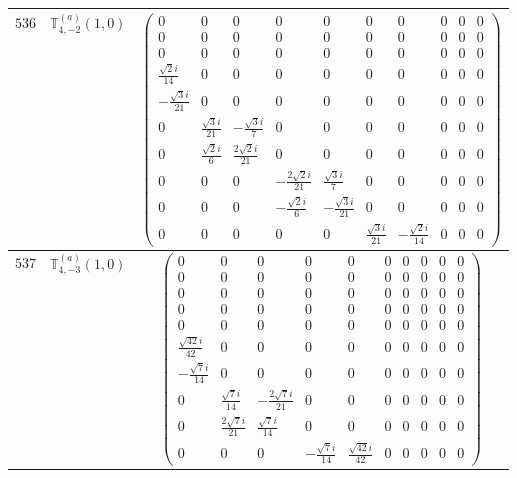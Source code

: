\documentclass[fleqn,8pt,landscape]{jsarticle}
\begin{document}
\begin{center}
\begin{longtable}{ccc}
$ 536 $ & $ \mathbb{T}_{4,-2}^{(a)}(1,0) $ & $ \begin{pmatrix} 0 & 0 & 0 & 0 & 0 & 0 & 0 & 0 & 0 & 0 \\ 0 & 0 & 0 & 0 & 0 & 0 & 0 & 0 & 0 & 0 \\ 0 & 0 & 0 & 0 & 0 & 0 & 0 & 0 & 0 & 0 \\ \frac{\sqrt{2} i}{14} & 0 & 0 & 0 & 0 & 0 & 0 & 0 & 0 & 0 \\ - \frac{\sqrt{3} i}{21} & 0 & 0 & 0 & 0 & 0 & 0 & 0 & 0 & 0 \\ 0 & \frac{\sqrt{3} i}{21} & - \frac{\sqrt{3} i}{7} & 0 & 0 & 0 & 0 & 0 & 0 & 0 \\ 0 & \frac{\sqrt{2} i}{6} & \frac{2 \sqrt{2} i}{21} & 0 & 0 & 0 & 0 & 0 & 0 & 0 \\ 0 & 0 & 0 & - \frac{2 \sqrt{2} i}{21} & \frac{\sqrt{3} i}{7} & 0 & 0 & 0 & 0 & 0 \\ 0 & 0 & 0 & - \frac{\sqrt{2} i}{6} & - \frac{\sqrt{3} i}{21} & 0 & 0 & 0 & 0 & 0 \\ 0 & 0 & 0 & 0 & 0 & \frac{\sqrt{3} i}{21} & - \frac{\sqrt{2} i}{14} & 0 & 0 & 0 \end{pmatrix} $ \\ \hline
$ 537 $ & $ \mathbb{T}_{4,-3}^{(a)}(1,0) $ & $ \begin{pmatrix} 0 & 0 & 0 & 0 & 0 & 0 & 0 & 0 & 0 & 0 \\ 0 & 0 & 0 & 0 & 0 & 0 & 0 & 0 & 0 & 0 \\ 0 & 0 & 0 & 0 & 0 & 0 & 0 & 0 & 0 & 0 \\ 0 & 0 & 0 & 0 & 0 & 0 & 0 & 0 & 0 & 0 \\ 0 & 0 & 0 & 0 & 0 & 0 & 0 & 0 & 0 & 0 \\ \frac{\sqrt{42} i}{42} & 0 & 0 & 0 & 0 & 0 & 0 & 0 & 0 & 0 \\ - \frac{\sqrt{7} i}{14} & 0 & 0 & 0 & 0 & 0 & 0 & 0 & 0 & 0 \\ 0 & \frac{\sqrt{7} i}{14} & - \frac{2 \sqrt{7} i}{21} & 0 & 0 & 0 & 0 & 0 & 0 & 0 \\ 0 & \frac{2 \sqrt{7} i}{21} & \frac{\sqrt{7} i}{14} & 0 & 0 & 0 & 0 & 0 & 0 & 0 \\ 0 & 0 & 0 & - \frac{\sqrt{7} i}{14} & \frac{\sqrt{42} i}{42} & 0 & 0 & 0 & 0 & 0 \end{pmatrix} $ \\ \hline

\end{longtable}
\end{center}
\end{document}
